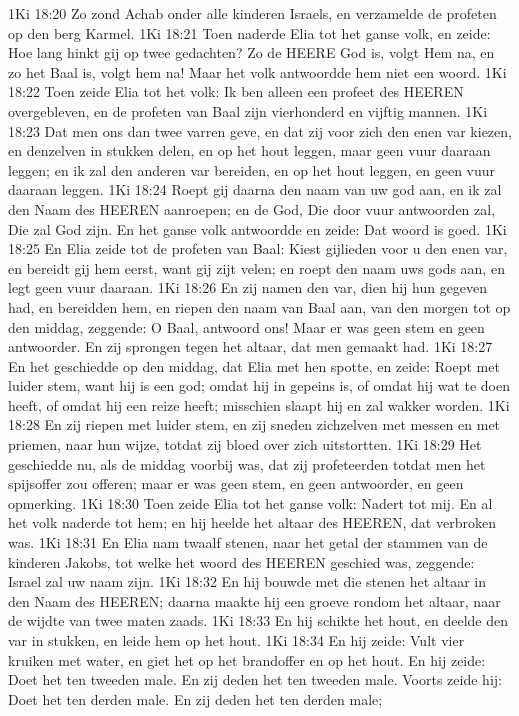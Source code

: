 1Ki 18:20  Zo zond Achab onder alle kinderen Israels, en verzamelde de profeten op den berg Karmel.
1Ki 18:21  Toen naderde Elia tot het ganse volk, en zeide: Hoe lang hinkt gij op twee gedachten? Zo de HEERE God is, volgt Hem na, en zo het Baal is, volgt hem na! Maar het volk antwoordde hem niet een woord.
1Ki 18:22  Toen zeide Elia tot het volk: Ik ben alleen een profeet des HEEREN overgebleven, en de profeten van Baal zijn vierhonderd en vijftig mannen.
1Ki 18:23  Dat men ons dan twee varren geve, en dat zij voor zich den enen var kiezen, en denzelven in stukken delen, en op het hout leggen, maar geen vuur daaraan leggen; en ik zal den anderen var bereiden, en op het hout leggen, en geen vuur daaraan leggen.
1Ki 18:24  Roept gij daarna den naam van uw god aan, en ik zal den Naam des HEEREN aanroepen; en de God, Die door vuur antwoorden zal, Die zal God zijn. En het ganse volk antwoordde en zeide: Dat woord is goed.
1Ki 18:25  En Elia zeide tot de profeten van Baal: Kiest gijlieden voor u den enen var, en bereidt gij hem eerst, want gij zijt velen; en roept den naam uws gods aan, en legt geen vuur daaraan.
1Ki 18:26  En zij namen den var, dien hij hun gegeven had, en bereidden hem, en riepen den naam van Baal aan, van den morgen tot op den middag, zeggende: O Baal, antwoord ons! Maar er was geen stem en geen antwoorder. En zij sprongen tegen het altaar, dat men gemaakt had.
1Ki 18:27  En het geschiedde op den middag, dat Elia met hen spotte, en zeide: Roept met luider stem, want hij is een god; omdat hij in gepeins is, of omdat hij wat te doen heeft, of omdat hij een reize heeft; misschien slaapt hij en zal wakker worden.
1Ki 18:28  En zij riepen met luider stem, en zij sneden zichzelven met messen en met priemen, naar hun wijze, totdat zij bloed over zich uitstortten.
1Ki 18:29  Het geschiedde nu, als de middag voorbij was, dat zij profeteerden totdat men het spijsoffer zou offeren; maar er was geen stem, en geen antwoorder, en geen opmerking.
1Ki 18:30  Toen zeide Elia tot het ganse volk: Nadert tot mij. En al het volk naderde tot hem; en hij heelde het altaar des HEEREN, dat verbroken was.
1Ki 18:31  En Elia nam twaalf stenen, naar het getal der stammen van de kinderen Jakobs, tot welke het woord des HEEREN geschied was, zeggende: Israel zal uw naam zijn.
1Ki 18:32  En hij bouwde met die stenen het altaar in den Naam des HEEREN; daarna maakte hij een groeve rondom het altaar, naar de wijdte van twee maten zaads.
1Ki 18:33  En hij schikte het hout, en deelde den var in stukken, en leide hem op het hout.
1Ki 18:34  En hij zeide: Vult vier kruiken met water, en giet het op het brandoffer en op het hout. En hij zeide: Doet het ten tweeden male. En zij deden het ten tweeden male. Voorts zeide hij: Doet het ten derden male. En zij deden het ten derden male;
